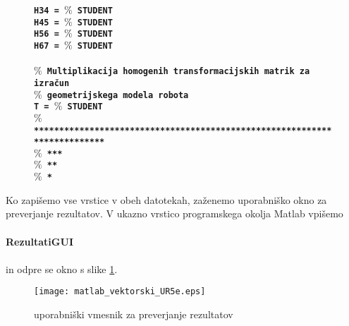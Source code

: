 \begin{figure}[h]
\textbf{\texttt{\hspace*{1cm}H34 = \textcolor[rgb]{0.13,0.55,0.13}{$\%$ STUDENT}}}\\ %
\textbf{\texttt{\hspace*{1cm}H45 = \textcolor[rgb]{0.13,0.55,0.13}{$\%$ STUDENT}}}\\ %
\textbf{\texttt{\hspace*{1cm}H56 = \textcolor[rgb]{0.13,0.55,0.13}{$\%$ STUDENT}}}\\ %
\textbf{\texttt{\hspace*{1cm}H67 = \textcolor[rgb]{0.13,0.55,0.13}{$\%$ STUDENT}}}\\ %
\\ %
\textcolor[rgb]{0.13,0.55,0.13}{\textbf{\texttt{$\%$ Multiplikacija homogenih transformacijskih matrik za izračun}}}\\ %
\textcolor[rgb]{0.13,0.55,0.13}{\textbf{\texttt{$\%$ geometrijskega modela robota}}}\\ %
\textbf{\texttt{\hspace*{1cm}T = \textcolor[rgb]{0.13,0.55,0.13}{$\%$ STUDENT}}}\\ %
\textcolor[rgb]{0.13,0.55,0.13}{\textbf{\texttt{$\%$ *************************************************************************}}}\\ %
\textcolor[rgb]{0.13,0.55,0.13}{\textbf{\texttt{$\%$ ***}}}\\ %
\textcolor[rgb]{0.13,0.55,0.13}{\textbf{\texttt{$\%$ **}}}\\ %
\textcolor[rgb]{0.13,0.55,0.13}{\textbf{\texttt{$\%$ *}}}\\ %
\end{figure}
\vspace{-0.1cm} %

Ko zapišemo vse vrstice v obeh datotekah, zaženemo
uporabniško okno za preverjanje rezultatov. V ukazno vrstico programskega okolja Matlab vpišemo\\
\vspace{-0.2cm}\\%
\textbf{RezultatiGUI} \\ %
\vspace{-0.2cm}\\%
in odpre se okno s slike \ref{fGUI}.

\begin{figure}[h]
    \centering
    \texttt{[image: matlab\_vektorski\_UR5e.eps]}
    \vspace{-0.3cm}
    \caption{uporabniški vmesnik za preverjanje rezultatov}
    \label{fGUI}
\end{figure}

